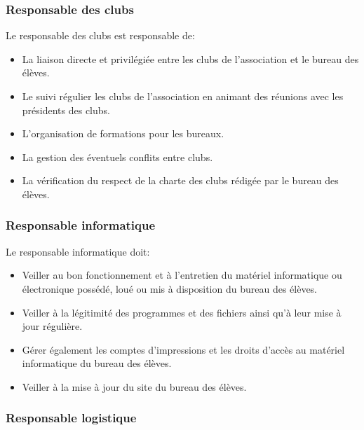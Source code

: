 \documentclass{article} %
\begin{document}
			\subsubsection{Responsable des clubs}
\label{ssub:responsable_des_clubs}

				Le responsable des clubs est responsable de:
				\begin{itemize}
					\item La liaison directe et privilégiée entre les clubs de
						l’association et le bureau des élèves.
					\item Le suivi régulier les clubs de l’association en
						animant des réunions avec les
						présidents des clubs.
					\item L’organisation de formations pour les bureaux.
					\item La gestion des éventuels conflits entre clubs.
					\item La vérification du respect de la charte des clubs
						rédigée par le bureau des élèves.
				\end{itemize}

			\subsubsection{Responsable informatique}
\label{ssub:responsable_informatique}

				Le responsable informatique doit:
				\begin{itemize}
					\item Veiller au bon fonctionnement et à l’entretien du
						matériel informatique ou électronique possédé, loué ou
						mis à disposition du bureau des élèves.
					\item Veiller à la légitimité des programmes et des fichiers
						ainsi qu’à leur mise à jour régulière.
					\item Gérer également les comptes d’impressions et les
						droits d’accès au matériel informatique du bureau des
						élèves.
					\item Veiller à la mise à jour du site du bureau des élèves.
				\end{itemize}

			\subsubsection{Responsable logistique}
\label{ssub:responsable_logistique}
\end{document}
